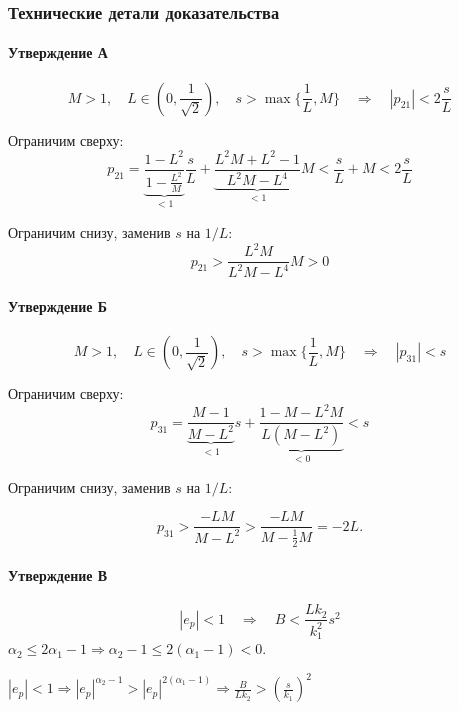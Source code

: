 \documentclass{article}
\begin{document}
\subsubsection{Технические детали доказательства}

\paragraph{Утверждение А}

\begin{equation}
M>1, \quad L\in \left(0,\frac{1}{\sqrt{2}}\right),\quad s>\max\{\frac{1}{L}, M\} \quad \Rightarrow \quad |p_{21}|<2\frac{s}{L}
\label{eq:p21a}
\end{equation}

Ограничим сверху:
$$
p_{21} = \underbrace{\frac{1-L^2}{1-\frac{L^2}{M}}}_{<1}\frac{s}{L} + \underbrace{\frac{L^2M + L^2 -1}{L^2M - L^4}}_{<1} M < \frac{s}{L} + M < 2\frac{s}{L}
$$

Ограничим снизу, заменив $s$ на $1/L$:
$$
p_{21} > \frac{L^2 M}{L^2M - L^4} M > 0
$$

\paragraph{Утверждение Б}

\begin{equation}
M>1, \quad L\in \left(0,\frac{1}{\sqrt{2}}\right),\quad s>\max\{\frac{1}{L}, M\} \quad \Rightarrow \quad |p_{31}|<s
\label{eq:p21a}
\end{equation}

Ограничим сверху:
$$
p_{31} = \underbrace{\frac{M-1}{M-L^2}}_{<1}s + \underbrace{\frac{1-M-L^2M}{L(M-L^2)}}_{<0} < s
$$

Ограничим снизу, заменив $s$ на $1/L$:

$$
p_{31} > \frac{-LM}{M-L^2} > \frac{-LM}{M-\frac{1}{2}M} = -2L.
$$

\paragraph{Утверждение В}

\begin{equation}
\label{eq:B}
|e_p|< 1 \quad \Rightarrow \quad B < \frac{L k_2}{k_1^2} s^2 
\end{equation}
$
\alpha_2  \leq  2\alpha_1 - 1 \Rightarrow
\alpha_2-1 \leq 2(\alpha_1-1) < 0.
$

$|e_p|< 1 \Rightarrow |e_p|^{\alpha_2-1} > |e_p|^{2(\alpha_1-1)} \Rightarrow \frac{B}{Lk_2} > \left(\frac{s}{k_1}\right)^2$  
\end{document}
